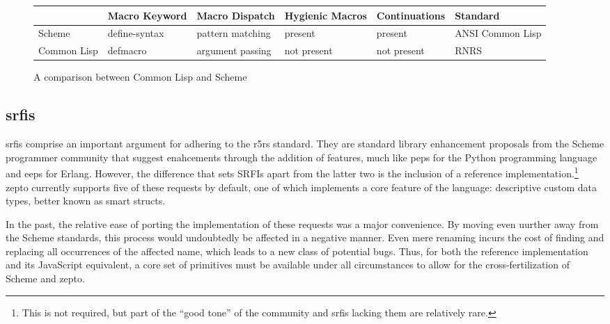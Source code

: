 \documentclass[oneside,11pt,xetex]{scrbook}
\begin{document}
\begin{center}
\begin{figure}
  \begin{tabu}{| l | l | l | l | l | l |}
  \hline
  \rowfont{\footnotesize}
              & Macro Keyword & Macro Dispatch   & Hygienic Macros & Continuations & Standard\\ \hline
  \rowfont{\footnotesize}
  Scheme      & define-syntax & pattern matching & present         & present       & ANSI Common Lisp\\ \hline
  \rowfont{\footnotesize}
  Common Lisp & defmacro      & argument passing & not present     & not present   & RNRS\\ \hline
  \end{tabu}
  \caption{A comparison between Common Lisp and Scheme}
\label{fig:lispcomp}
\end{figure}
\end{center}

\subsection{\glspl{srfi}}

\glspl{srfi} comprise an important argument for adhering to the \gls{r5rs} standard. They are
standard library enhancement proposals from the Scheme programmer community that suggest
enahcements through the addition of features, much like \glspl{pep} for the Python
programming language and \glspl{eep} for Erlang. However, the difference that sets SRFIs
apart from the latter two is the inclusion of a reference implementation.\footnote{This
is not required, but part of the ``good tone'' of the community and \gls{srfi}s lacking them
are relatively rare.} zepto currently supports five of these requests by default,
one of which implements a core feature of the language: descriptive custom data types, better
known as smart structs.

In the past, the relative ease of porting the implementation of these requests was a major
convenience. By moving even uurther away from the Scheme standards, this process would
undoubtedly be affected in a negative manner. Even mere renaming incurs the cost of finding
and replacing all occurrences of the affected name, which leads to a new class of potential
bugs. Thus, for both the reference implementation and its
JavaScript equivalent, a core set of primitives must be available under all circumstances
to allow for the cross-fertilization of Scheme and zepto.
\end{document}
